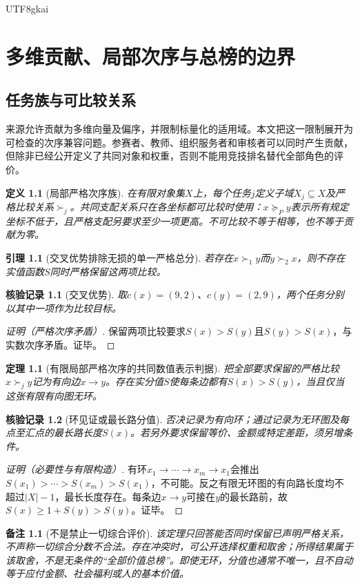 \documentclass[12pt,a4paper,openany]{report}
\newtheorem{definition}{定义}[chapter]
\newtheorem{theorem}{定理}[chapter]
\newtheorem{lemma}{引理}[chapter]
\newtheorem{remark}{备注}[chapter]
\newtheorem{Certificate}{核验记录}[chapter]
\begin{document}
\begin{CJK*}{UTF8}{gkai}
\chapter{多维贡献、局部次序与总榜的边界}
\label{chap:orders}
\section{任务族与可比较关系}
来源\cite[“贡献不是全部社会价值的单一度量”]{SourceSupplement}允许贡献为多维向量及偏序，并限制标量化的适用域。本文把这一限制展开为可检查的次序兼容问题。参赛者、教师、组织服务者和审核者可以同时产生贡献，但除非已经公开定义了共同对象和权重，否则不能用竞技排名替代全部角色的评价。
\begin{definition}[局部严格次序族]
\label{def:orders}
在有限对象集$X$上，每个任务$j$定义子域$X_j\subseteq X$及严格比较关系$\succ_j$。共同支配关系只在各坐标都可比较时使用：$x\succeq_Py$表示所有规定坐标不低于，且严格支配另要求至少一项更高。不可比较不等于相等，也不等于贡献为零。
\end{definition}
\begin{lemma}[交叉优势排除无损的单一严格总分]
\label{lem:rank-conflict}
若存在$x\succ_1y$而$y\succ_2x$，则不存在实值函数$S$同时严格保留这两项比较。
\end{lemma}
\begin{Certificate}[交叉优势]
取$c(x)=(9,2)$、$c(y)=(2,9)$，两个任务分别以其中一项作为比较目标。
\end{Certificate}
\begin{proof}[证明（严格次序矛盾）]
保留两项比较要求$S(x)>S(y)$且$S(y)>S(x)$，与实数次序矛盾。证毕。
\end{proof}
\begin{theorem}[有限局部严格次序的共同数值表示判据]
\label{thm:rank-dag}
把全部要求保留的严格比较$x\succ_jy$记为有向边$x\to y$。存在实分值$S$使每条边都有$S(x)>S(y)$，当且仅当这张有限有向图无环。
\end{theorem}
\begin{Certificate}[环见证或最长路分值]
否决记录为有向环；通过记录为无环图及每点至汇点的最长路长度$S(x)$。若另外要求保留等价、金额或特定差距，须另增条件。
\end{Certificate}
\begin{proof}[证明（必要性与有限构造）]
有环$x_1\to\cdots\to x_m\to x_1$会推出$S(x_1)>\cdots>S(x_m)>S(x_1)$，不可能。反之有限无环图的有向路长度均不超过$|X|-1$，最长长度存在。每条边$x\to y$可接在$y$的最长路前，故$S(x)\ge1+S(y)>S(y)$。证毕。
\end{proof}
\begin{remark}[不是禁止一切综合评价]
该定理只回答能否同时保留已声明严格关系，不声称一切综合分数不合法。存在冲突时，可公开选择权重和取舍；所得结果属于该取舍，不是无条件的“全部价值总榜”。即使无环，分值也通常不唯一，且不自动等于应付金额、社会福利或人的基本价值。
\end{remark}


\end{CJK*}
\end{document}
